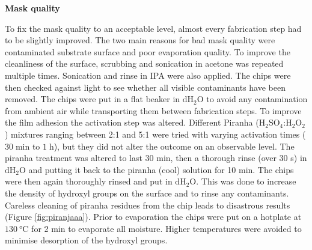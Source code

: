 \documentclass[final]{jyflluk}
\begin{document}
\begin{flushleft}\textbf{Mask quality} \end{flushleft}
To fix the mask quality to an acceptable level, almost every fabrication step had to be slightly improved. The two main reasons for bad mask quality were contaminated substrate surface and poor evaporation quality. To improve the cleanliness of the surface, scrubbing and sonication in acetone was repeated multiple times. Sonication and rinse in IPA were also applied. The chips were then checked against light to see whether all visible contaminants have been removed. The chips were put in a flat beaker in $\mathrm{dH_2 O}$ to avoid any contamination from ambient air while transporting them between fabrication steps. 
To improve the film adhesion the activation step was altered. Different Piranha ($\mathrm{H_2 SO_4}$:$\mathrm{H_2 O_2}$) mixtures ranging between 2:1 and 5:1 were tried with varying activation times ($30 \;$min to $1\;$h), but they did not alter the outcome on an observable level. The piranha treatment was altered to last 30 min, then a thorough rinse (over 30 s) in $\mathrm{dH_2 O}$ and putting it back to the piranha (cool) solution for 10 min. The chips were then again thoroughly rinsed and put in $\mathrm{dH_2 O}$. This was done to increase the density of hydroxyl groups on the surface and to rinse any contaminants. Careless cleaning of piranha residues from the chip leads to disastrous results (Figure \ref{fig:piranjaaa}). Prior to evaporation the chips were put on a hotplate at $\SI{130}{\celsius}$ for 2 min to evaporate all moisture. Higher temperatures were avoided to minimise desorption of the hydroxyl groups.
\end{document}
